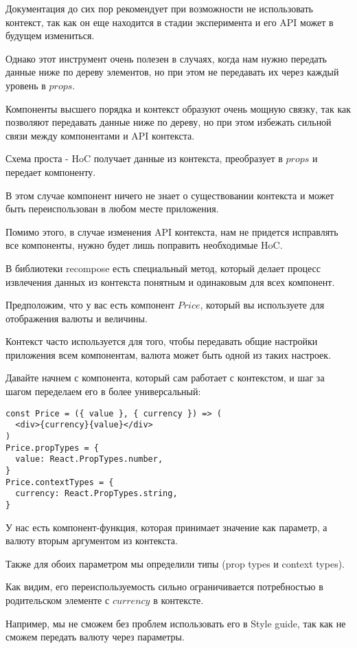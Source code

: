 Документация до сих пор рекомендует при возможности не использовать контекст, так как он еще находится в стадии эксперимента и его API может в будущем измениться.

Однако этот инструмент очень полезен в случаях, когда нам нужно передать данные ниже по дереву элементов, но при этом не передавать их через каждый уровень в $props$.

Компоненты высшего порядка и контекст образуют очень мощную связку, так как позволяют передавать данные ниже по дереву, но при этом избежать сильной связи между компонентами и API контекста.

Схема проста - HoC получает данные из контекста, преобразует в $props$ и передает компоненту.

В этом случае компонент ничего не знает о существовании контекста и может быть переиспользован в любом месте приложения.

Помимо этого, в случае изменения API контекста, нам не придется исправлять все компоненты, нужно будет лишь поправить необходимые HoC.

В библиотеки recompose есть специальный метод, который делает процесс извлечения данных из контекста понятным и одинаковым для всех компонент.

Предположим, что у вас есть компонент $Price$, который вы используете для отображения валюты и величины. 
 
 Контекст часто используется для того, чтобы передавать общие настройки приложения всем компонентам, валюта может быть одной из таких настроек.
 
 Давайте начнем с компонента, который сам работает с контекстом, и шаг за шагом переделаем его в более универсальный:
 
\begin{lstlisting}
const Price = ({ value }, { currency }) => (
  <div>{currency}{value}</div>
)
Price.propTypes = {
  value: React.PropTypes.number,
}
Price.contextTypes = {
  currency: React.PropTypes.string,
}
\end{lstlisting}

У нас есть компонент-функция, которая принимает значение как параметр, а валюту вторым аргументом из контекста.

Также для обоих параметром мы определили типы (prop types и context types).

Как видим, его переиспользуемость сильно ограничивается потребностью в родительском элементе с $currency$ в контексте.

Например, мы не сможем без проблем использовать его в Style guide, так как не сможем передать валюту через параметры.

